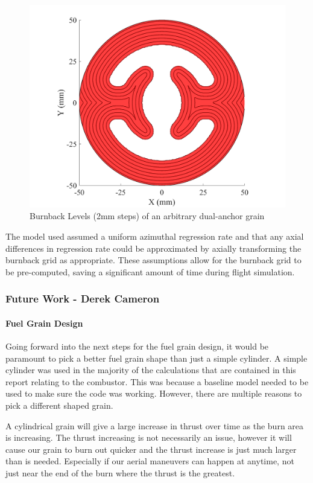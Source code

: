 \begin{figure}[H]
    \centering
    \includegraphics[width=0.7\linewidth]{LevelSet_Figures/anchorGrainBurnback.png}
    \caption{Burnback Levels (2mm steps) of an arbitrary dual-anchor grain}
    \label{fig:finocyleBurnback}
\end{figure}

The model used assumed a uniform azimuthal regression rate and that any axial differences in regression rate could be approximated by axially transforming the burnback grid as appropriate. These assumptions allow for the burnback grid to be pre-computed, saving a significant amount of time during flight simulation. 

\subsubsection{Future Work - Derek Cameron}
\paragraph{Fuel Grain Design}


Going forward into the next steps for the fuel grain design, it would be paramount to pick a better fuel grain shape than just a simple cylinder. A simple cylinder was used in the majority of the calculations that are contained in this report relating to the combustor. This was because a baseline model needed to be used to make sure the code was working. However, there are multiple reasons to pick a different shaped grain.


A cylindrical grain will give a large increase in thrust over time as the burn area is increasing. The thrust increasing is not necessarily an issue, however it will cause our grain to burn out quicker and the thrust increase is just much larger than is needed. Especially if our aerial maneuvers can happen at anytime, not just near the end of the burn where the thrust is the greatest.

